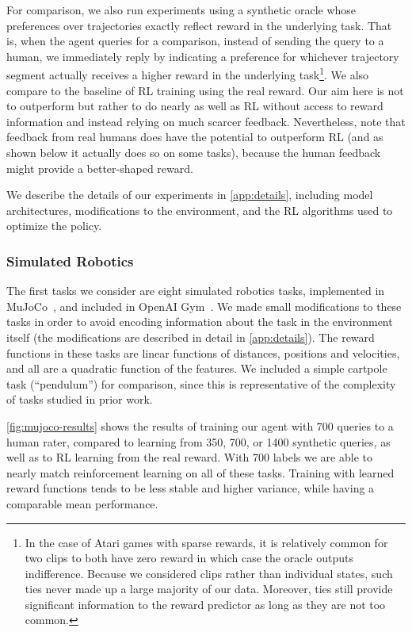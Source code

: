 For comparison, we also run experiments using a synthetic oracle whose preferences over trajectories exactly reflect reward in the underlying task. That is, when the agent queries for a comparison, instead of sending the query to a human, we immediately reply by indicating a preference for whichever trajectory segment actually receives a higher reward in the underlying task\footnote{In the case of Atari games with sparse rewards, it is relatively common for two clips to both have zero reward in which case the oracle outputs indifference. Because we considered clips rather than individual states, such ties never made up a large majority of our data. Moreover, ties still provide significant information to the reward predictor as long as they are not too common.}. We also compare to the baseline of RL training using the real reward. Our aim here is not to outperform but rather to do nearly as well as RL without access to reward information and instead relying on much scarcer feedback. Nevertheless, note that feedback from real humans does have the potential to outperform RL (and as shown below it actually does so on some tasks), because the human feedback might provide a better-shaped reward.

We describe the details of our experiments in \autoref{app:details},
including model architectures, modifications to the environment, and the RL algorithms used to optimize the policy.

\subsubsection{Simulated Robotics}

The first tasks we consider are eight simulated robotics tasks, implemented in MuJoCo~\citep{Todorov12}, and included in OpenAI Gym~\citep{Brockman16}. We made small modifications to these tasks in order to avoid encoding information about the task in the environment itself (the modifications are described in detail in \autoref{app:details}).
The reward functions in these tasks are linear functions of distances, positions and velocities, and all are a quadratic function of the features. We included a simple cartpole task (``pendulum'') for comparison, since this is representative of the complexity of tasks studied in prior work.

\autoref{fig:mujoco-results} shows the results of training our agent with 700 queries to a human rater, compared to learning from 350, 700, or 1400 synthetic queries, as well as to RL learning from the real reward. With 700 labels we are able to nearly match reinforcement learning on all of these tasks. Training with learned reward functions tends to be less stable and higher variance, while having a comparable mean performance.

